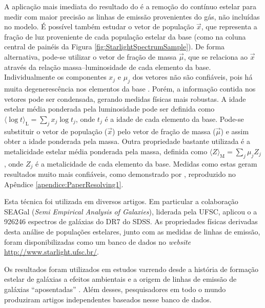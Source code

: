 
A aplicação mais imediata do resultado do \starlight é a remoção do contínuo
estelar para medir com maior precisão as linhas de emissão provenientes do gás,
não incluídas no modelo. É possível também estudar o vetor de população
$\vec{x}$, que representa a fração de luz proveniente de cada população estelar
da base (como na coluna central de painéis da Figura
\ref{fig:StarlightSpectrumSample}). De forma alternativa, pode-se utilizar o
vetor de fração de massa $\vec{\mu}$, que se relaciona ao $\vec{x}$ através da
relação massa--luminosidade de cada elemento da base. Individualmente os
componentes $x_j$ e $\mu_j$ dos vetores não são confiáveis, pois há muita
degenerescência nos elementos da base \citep{CidFernandes2005}. Porém, a
informação contida nos vetores pode ser condensada, gerando medidas físicas mais
robustas. A idade estelar média ponderada pela luminosidade pode ser definida
como $\langle \log t \rangle_{\mathrm{L}} = \sum_j x_j \log t_j$, onde $t_j$ é a
idade de cada elemento da base.
Pode-se substituir o vetor de população ($\vec{x}$) pelo vetor de fração de
massa ($\vec{\mu}$) e assim obter a idade ponderada pela massa. Outra
propriedade bastante utilizada é a metalicidade estelar média ponderada pela
massa, definida como $\langle Z \rangle_{\mathrm{M}} = \sum_j \mu_j Z_j$, onde
$Z_j$ é a metalicidade de cada elemento da base. Medidas como estas geram
resultados muito mais confiáveis, como demonstrado por \citet{CidFernandes2014},
reproduzido no Apêndice \ref{apendice:PaperResolving1}.

Esta técnica foi utilizada em diversos artigos. Em particular a colaboração
SEAGal ({\em Semi Empirical Analysis of Galaxies}), liderada pela UFSC, aplicou
o \starlight a 926246 espectros de galáxias do DR7 do SDSS. As propriedades
físicas derivadas desta análise de populações estelares, junto com as medidas de
linhas de emissão, foram disponibilizadas como um banco de dados no {\em
website} \url{http://www.starlight.ufsc.br/}.

Os resultados foram utilizados em estudos varrendo desde a história de formação
estelar de galáxias \citep{Asari2007} a efeitos ambientais \citep{Mateus2007} e
a origem de linhas de emissão de galáxias ``aposentadas'' \citep{Stasinska2008,
CidFernandes2011}. Além desses, pesquisadores em todo o mundo produziram artigos
independentes \citep[para citar alguns]{Bian2006, Liang2007, Peeples2009,
Lara-Lopez2009, Lara-Lopez2010} baseados nesse banco de dados.

